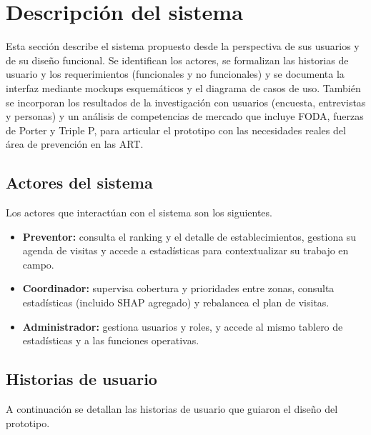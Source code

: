 \chapter{Descripci\'on del sistema}\label{ch:descripcion}

Esta secci\'on describe el sistema propuesto desde la perspectiva de sus usuarios y de su dise\~no funcional.
Se identifican los actores, se formalizan las historias de usuario y los requerimientos (funcionales y no funcionales) y se documenta la interfaz mediante mockups esquem\'aticos y el diagrama de casos de uso.
Tambi\'en se incorporan los resultados de la investigaci\'on con usuarios (encuesta, entrevistas y personas) y un an\'alisis de competencias de mercado que incluye FODA, fuerzas de Porter y Triple P, para articular el prototipo con las necesidades reales del \'area de prevenci\'on en las ART.

\section{Actores del sistema}

Los actores que interact\'uan con el sistema son los siguientes.

\begin{itemize}
	\item \textbf{Preventor:} consulta el ranking y el detalle de establecimientos, gestiona su agenda de visitas y accede a estad\'isticas para contextualizar su trabajo en campo.
	\item \textbf{Coordinador:} supervisa cobertura y prioridades entre zonas, consulta estad\'isticas (incluido SHAP agregado) y rebalancea el plan de visitas.
	\item \textbf{Administrador:} gestiona usuarios y roles, y accede al mismo tablero de estad\'isticas y a las funciones operativas.
\end{itemize}

\section{Historias de usuario}

A continuaci\'on se detallan las historias de usuario que guiaron el dise\~no del prototipo.

